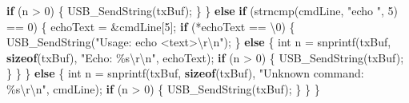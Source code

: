 \documentclass[
  chinese,
  UTF8,
  oneside,
  openany]{ctexbook}
\newenvironment{Shaded}{}{}
\newcommand{\CharTok}[1]{\textcolor[rgb]{0.25,0.44,0.63}{#1}}
\newcommand{\ControlFlowTok}[1]{\textcolor[rgb]{0.00,0.44,0.13}{\textbf{#1}}}
\newcommand{\DataTypeTok}[1]{\textcolor[rgb]{0.56,0.13,0.00}{#1}}
\newcommand{\DecValTok}[1]{\textcolor[rgb]{0.25,0.63,0.44}{#1}}
\newcommand{\KeywordTok}[1]{\textcolor[rgb]{0.00,0.44,0.13}{\textbf{#1}}}
\newcommand{\NormalTok}[1]{#1}
\newcommand{\OperatorTok}[1]{\textcolor[rgb]{0.40,0.40,0.40}{#1}}
\newcommand{\SpecialCharTok}[1]{\textcolor[rgb]{0.25,0.44,0.63}{#1}}
\newcommand{\StringTok}[1]{\textcolor[rgb]{0.25,0.44,0.63}{#1}}
\begin{document}
\begin{Shaded}
\begin{Highlighting}[]
        \ControlFlowTok{if} \OperatorTok{(}\NormalTok{n }\OperatorTok{\textgreater{}} \DecValTok{0}\OperatorTok{)}
        \OperatorTok{\{}
\NormalTok{            USB\_SendString}\OperatorTok{(}\NormalTok{txBuf}\OperatorTok{);}
        \OperatorTok{\}}
    \OperatorTok{\}}
    \ControlFlowTok{else} \ControlFlowTok{if} \OperatorTok{(}\NormalTok{strncmp}\OperatorTok{(}\NormalTok{cmdLine}\OperatorTok{,} \StringTok{"echo "}\OperatorTok{,} \DecValTok{5}\OperatorTok{)} \OperatorTok{==} \DecValTok{0}\OperatorTok{)}
    \OperatorTok{\{}
\NormalTok{        echoText }\OperatorTok{=} \OperatorTok{\&}\NormalTok{cmdLine}\OperatorTok{[}\DecValTok{5}\OperatorTok{];}
        \ControlFlowTok{if} \OperatorTok{(*}\NormalTok{echoText }\OperatorTok{==} \CharTok{\textquotesingle{}}\SpecialCharTok{\textbackslash{}0}\CharTok{\textquotesingle{}}\OperatorTok{)}
        \OperatorTok{\{}
\NormalTok{            USB\_SendString}\OperatorTok{(}\StringTok{"Usage: echo \textless{}text\textgreater{}}\SpecialCharTok{\textbackslash{}r\textbackslash{}n}\StringTok{"}\OperatorTok{);}
        \OperatorTok{\}}
        \ControlFlowTok{else}
        \OperatorTok{\{}
            \DataTypeTok{int}\NormalTok{ n }\OperatorTok{=}\NormalTok{ snprintf}\OperatorTok{(}\NormalTok{txBuf}\OperatorTok{,} \KeywordTok{sizeof}\OperatorTok{(}\NormalTok{txBuf}\OperatorTok{),} \StringTok{"Echo: }\SpecialCharTok{\%s\textbackslash{}r\textbackslash{}n}\StringTok{"}\OperatorTok{,}\NormalTok{ echoText}\OperatorTok{);}
            \ControlFlowTok{if} \OperatorTok{(}\NormalTok{n }\OperatorTok{\textgreater{}} \DecValTok{0}\OperatorTok{)}
            \OperatorTok{\{}
\NormalTok{                USB\_SendString}\OperatorTok{(}\NormalTok{txBuf}\OperatorTok{);}
            \OperatorTok{\}}
        \OperatorTok{\}}
    \OperatorTok{\}}
    \ControlFlowTok{else}
    \OperatorTok{\{}
        \DataTypeTok{int}\NormalTok{ n }\OperatorTok{=}\NormalTok{ snprintf}\OperatorTok{(}\NormalTok{txBuf}\OperatorTok{,} \KeywordTok{sizeof}\OperatorTok{(}\NormalTok{txBuf}\OperatorTok{),} \StringTok{"Unknown command: }\SpecialCharTok{\%s\textbackslash{}r\textbackslash{}n}\StringTok{"}\OperatorTok{,}\NormalTok{ cmdLine}\OperatorTok{);}
        \ControlFlowTok{if} \OperatorTok{(}\NormalTok{n }\OperatorTok{\textgreater{}} \DecValTok{0}\OperatorTok{)}
        \OperatorTok{\{}
\NormalTok{            USB\_SendString}\OperatorTok{(}\NormalTok{txBuf}\OperatorTok{);}
        \OperatorTok{\}}
    \OperatorTok{\}}
\OperatorTok{\}}
\end{Highlighting}
\end{Shaded}
\end{document}

